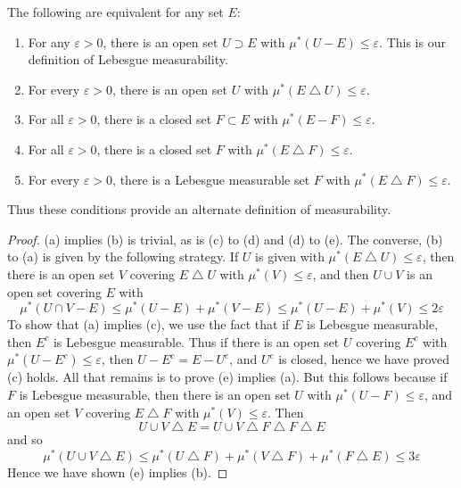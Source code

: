 \begin{theorem}
  The following are equivalent for any set $E$:
  \begin{enumerate}
    \item[(a)] For any $\varepsilon > 0$, there is an open set $U \supset E$ with $\mu^*(U - E) \leq \varepsilon$. This is our definition of Lebesgue measurability.
    \item[(b)] For every $\varepsilon > 0$, there is an open set $U$ with $\mu^*(E \bigtriangleup U) \leq \varepsilon$.
    \item[(c)] For all $\varepsilon > 0$, there is a closed set $F \subset E$ with $\mu^*(E - F) \leq \varepsilon$.
    \item[(d)] For all $\varepsilon > 0$, there is a closed set $F$ with $\mu^*(E \bigtriangleup F) \leq \varepsilon$.
    \item[(e)] For every $\varepsilon > 0$, there is a Lebesgue measurable set $F$ with $\mu^*(E \bigtriangleup F) \leq \varepsilon$.
  \end{enumerate}
  Thus these conditions provide an alternate definition of measurability.
\end{theorem}
\begin{proof}
  (a) implies (b) is trivial, as is (c) to (d) and (d) to (e). The converse, (b) to (a) is given by the following strategy. If $U$ is given with $\mu^*(E \bigtriangleup U) \leq \varepsilon$, then there is an open set $V$ covering $E \bigtriangleup U$ with $\mu^*(V) \leq \varepsilon$, and then $U \cup V$ is an open set covering $E$ with
  \[ \mu^*(U \cap V - E) \leq \mu^*(U - E) + \mu^*(V - E) \leq \mu^*(U - E) + \mu^*(V) \leq 2\varepsilon \]
  To show that (a) implies (c), we use the fact that if $E$ is Lebesgue measurable, then $E^c$ is Lebesgue measurable. Thus if there is an open set $U$ covering $E^c$ with $\mu^*(U - E^c) \leq \varepsilon$, then $U - E^c = E - U^c$, and $U^c$ is closed, hence we have proved (c) holds. All that remains is to prove (e) implies (a). But this follows because if $F$ is Lebesgue measurable, then there is an open set $U$ with $\mu^*(U - F) \leq \varepsilon$, and an open set $V$ covering $E \bigtriangleup F$ with $\mu^*(V) \leq \varepsilon$. Then
  \[ U \cup V \bigtriangleup E = U \cup V \bigtriangleup F \bigtriangleup F \bigtriangleup E \]
  and so
  \[ \mu^*(U \cup V \bigtriangleup E) \leq \mu^*(U \bigtriangleup F) + \mu^*(V \bigtriangleup F) + \mu^*(F \bigtriangleup E) \leq 3\varepsilon \]
  Hence we have shown (e) implies (b).
\end{proof}

